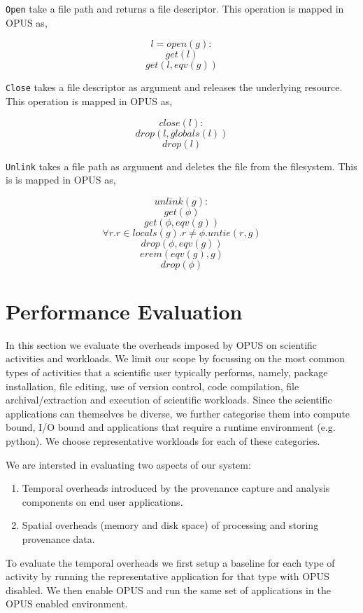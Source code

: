 \documentclass[withindex,glossary]{cam-thesis}
\begin{document}
\texttt{Open} take a file path and returns a file descriptor.
This operation is mapped in OPUS as,

$$l = open(g):$$
$$get(l)$$
$$get(l, eqv(g))$$

\texttt{Close} takes a file descriptor as argument and releases the underlying resource.
This operation is mapped in OPUS as,

$$close(l):$$
$$drop(l, globals(l))$$
$$drop(l)$$

\texttt{Unlink} takes a file path as argument and deletes the file from the filesystem.
This is is mapped in OPUS as,

$$unlink(g):$$
$$get(\phi)$$
$$get(\phi,eqv(g))$$
$$\forall r.r \in locals(g).r \neq \phi.untie(r,g)$$
$$drop(\phi,eqv(g))$$
$$erem(eqv(g),g)$$
$$drop(\phi)$$


\section{Performance Evaluation}
In this section we evaluate the overheads imposed by OPUS on scientific activities and workloads.
We limit our scope by focussing on the most common types of activities that a scientific user typically performs, namely, 
package installation, file editing, use of version control, code compilation, file archival/extraction and execution of scientific workloads.
Since the scientific applications can themselves be diverse, we further categorise them into compute bound, I/O bound and applications that require a runtime environment (e.g. python).
We choose representative workloads for each of these categories.

We are intersted in evaluating two aspects of our system:
\begin{enumerate}
\item Temporal overheads introduced by the provenance capture and analysis components on end user applications.
\item Spatial overheads (memory and disk space) of processing and storing provenance data.
\end{enumerate}

To evaluate the temporal overheads we first setup a baseline for each type of activity by running the representative application for that type with OPUS disabled.
We then enable OPUS and run the same set of applications in the OPUS enabled environment.
\end{document}
